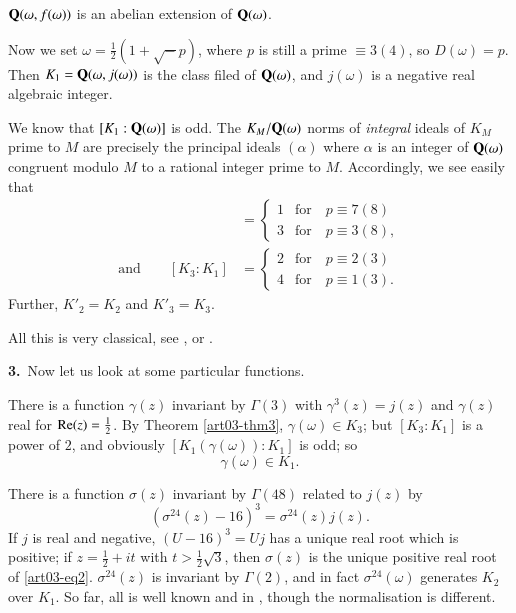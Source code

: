\begin{coro*}
$\mathbf{Q}(\omega,f(\omega))$ is an abelian extension of $\mathbf{Q}(\omega)$.
\end{coro*}

Now we set $\omega=\frac{1}{2}(1+\surd-p)$, where $p$ is still a prime $\equiv 3(4)$, so $D(\omega)=p$. Then $K_{1}=\mathbf{Q}(\omega,j(\omega))$ is the class filed of $\mathbf{Q}(\omega)$, and $j(\omega)$ is a negative real algebraic integer.

We know that $[K_{1}:\mathbf{Q}(\omega)]$ is odd. The $K_{M}/\mathbf{Q}(\omega)$ norms of {\em integral} ideals of $K_{M}$ prime to $M$ are precisely the principal ideals $(\alpha)$ where $\alpha$ is an integer of $\mathbf{Q}(\omega)$ congruent modulo $M$ to a rational integer prime to $M$. Accordingly, we see easily that
\begin{align*}
[K_{2}:K_{1}] &= 
\begin{cases}
1 & \text{for~~ } p\equiv 7(8)\\[4pt]
3 & \text{for~~ } p\equiv 3(8),
\end{cases}\\
\text{and}\qquad [K_{3}:K_{1}] &=
\begin{cases}
2 & \text{for~~ } p\equiv 2(3)\\[4pt]
4 & \text{for~~ } p\equiv 1(3).
\end{cases}
\end{align*}
Further, $K'_{2}=K_{2}$ and $K'_{3}=K_{3}$.

All this is very classical, see \cite{art03-key9}, \cite{art03-key6} or \cite{art03-key3}.

\medskip
\noindent
{\bf 3.}~Now let us look at some particular functions.

\setcounter{theorem}{0}
\begin{example}\label{art03-exam1}
There is a function $\gamma(z)$ invariant by $\Gamma(3)$ with $\gamma^{3}(z)=j(z)$ and $\gamma(z)$ real for $\operatorname{\mathrm{Re}}(z)=\frac{1}{2}$. By Theorem \ref{art03-thm3}, $\gamma(\omega)\in K_{3}$; but $[K_{3}:K_{1}]$ is a power of $2$, and obviously $[K_{1}(\gamma(\omega)):K_{1}]$ is odd; so
\begin{equation}
\gamma(\omega)\in K_{1}.\label{art03-eq1}
\end{equation}
\end{example}

\begin{example}\label{art03-exam2}
There is a function $\sigma(z)$ invariant by $\Gamma(48)$ related to $j(z)$ by
\begin{equation}
(\sigma^{24}(z)-16)^{3}=\sigma^{24}(z)j(z).\label{art03-eq2}
\end{equation}
If $j$ is real and negative, $(U-16)^{3}=Uj$ has a unique real root which is positive; if $z=\frac{1}{2}+it$ with $t>\frac{1}{2}\surd 3$, then $\sigma(z)$ is the unique positive real root of \eqref{art03-eq2}. $\sigma^{24}(z)$ is invariant by $\Gamma(2)$, and in fact $\sigma^{24}(\omega)$ generates $K_{2}$ over $K_{1}$. So far, all is well known and in \cite{art03-key9}, though the normalisation is different.
\end{example}

